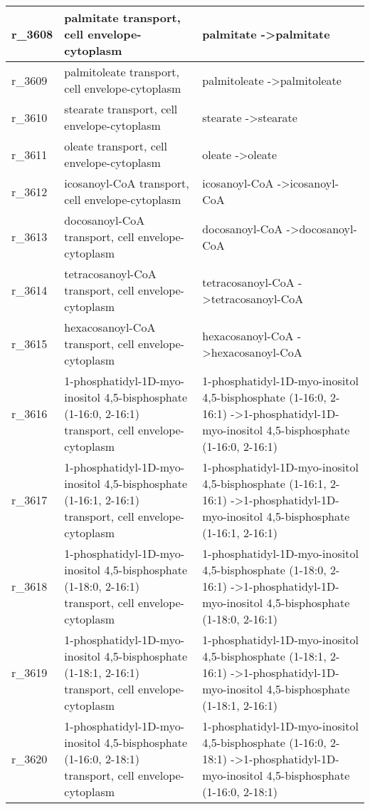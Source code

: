 \begin{landscape}
{\begin{longtable}{|l|p{7cm}|p{15cm}|}
r\_3608 & palmitate transport, cell envelope-cytoplasm & palmitate  -\textgreater palmitate \\ \hline
r\_3609 & palmitoleate transport, cell envelope-cytoplasm & palmitoleate  -\textgreater palmitoleate \\ \hline
r\_3610 & stearate transport, cell envelope-cytoplasm & stearate  -\textgreater stearate \\ \hline
r\_3611 & oleate transport, cell envelope-cytoplasm & oleate  -\textgreater oleate \\ \hline
r\_3612 & icosanoyl-CoA transport, cell envelope-cytoplasm & icosanoyl-CoA  -\textgreater icosanoyl-CoA \\ \hline
r\_3613 & docosanoyl-CoA transport, cell envelope-cytoplasm & docosanoyl-CoA  -\textgreater docosanoyl-CoA \\ \hline
r\_3614 & tetracosanoyl-CoA transport, cell envelope-cytoplasm & tetracosanoyl-CoA  -\textgreater tetracosanoyl-CoA \\ \hline
r\_3615 & hexacosanoyl-CoA transport, cell envelope-cytoplasm & hexacosanoyl-CoA  -\textgreater hexacosanoyl-CoA \\ \hline
r\_3616 & 1-phosphatidyl-1D-myo-inositol 4,5-bisphosphate (1-16:0, 2-16:1) transport, cell envelope-cytoplasm & 1-phosphatidyl-1D-myo-inositol 4,5-bisphosphate (1-16:0, 2-16:1)  -\textgreater 1-phosphatidyl-1D-myo-inositol 4,5-bisphosphate (1-16:0, 2-16:1) \\ \hline
r\_3617 & 1-phosphatidyl-1D-myo-inositol 4,5-bisphosphate (1-16:1, 2-16:1) transport, cell envelope-cytoplasm & 1-phosphatidyl-1D-myo-inositol 4,5-bisphosphate (1-16:1, 2-16:1)  -\textgreater 1-phosphatidyl-1D-myo-inositol 4,5-bisphosphate (1-16:1, 2-16:1) \\ \hline
r\_3618 & 1-phosphatidyl-1D-myo-inositol 4,5-bisphosphate (1-18:0, 2-16:1) transport, cell envelope-cytoplasm & 1-phosphatidyl-1D-myo-inositol 4,5-bisphosphate (1-18:0, 2-16:1)  -\textgreater 1-phosphatidyl-1D-myo-inositol 4,5-bisphosphate (1-18:0, 2-16:1) \\ \hline
r\_3619 & 1-phosphatidyl-1D-myo-inositol 4,5-bisphosphate (1-18:1, 2-16:1) transport, cell envelope-cytoplasm & 1-phosphatidyl-1D-myo-inositol 4,5-bisphosphate (1-18:1, 2-16:1)  -\textgreater 1-phosphatidyl-1D-myo-inositol 4,5-bisphosphate (1-18:1, 2-16:1) \\ \hline
r\_3620 & 1-phosphatidyl-1D-myo-inositol 4,5-bisphosphate (1-16:0, 2-18:1) transport, cell envelope-cytoplasm & 1-phosphatidyl-1D-myo-inositol 4,5-bisphosphate (1-16:0, 2-18:1)  -\textgreater 1-phosphatidyl-1D-myo-inositol 4,5-bisphosphate (1-16:0, 2-18:1) \\ \hline

\end{longtable}}
\end{landscape}
